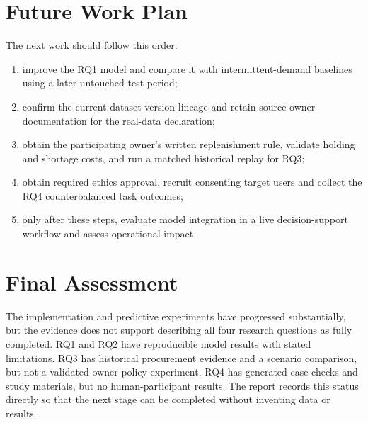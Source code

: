 \section{Future Work Plan}
The next work should follow this order:
\begin{enumerate}
\item improve the RQ1 model and compare it with intermittent-demand baselines using a later untouched test period;
\item confirm the current dataset version lineage and retain source-owner documentation for the real-data declaration;
\item obtain the participating owner's written replenishment rule, validate holding and shortage costs, and run a matched historical replay for RQ3;
\item obtain required ethics approval, recruit consenting target users and collect the RQ4 counterbalanced task outcomes;
\item only after these steps, evaluate model integration in a live decision-support workflow and assess operational impact.
\end{enumerate}

\section{Final Assessment}
The implementation and predictive experiments have progressed substantially, but the evidence does not support describing all four research questions as fully completed. RQ1 and RQ2 have reproducible model results with stated limitations. RQ3 has historical procurement evidence and a scenario comparison, but not a validated owner-policy experiment. RQ4 has generated-case checks and study materials, but no human-participant results. The report records this status directly so that the next stage can be completed without inventing data or results.
